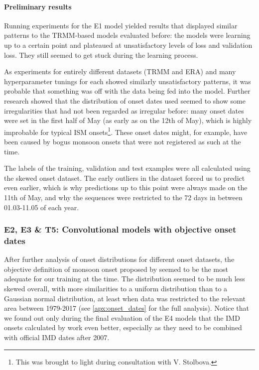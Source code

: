 \paragraph{Preliminary results}
\label{ssst:nn_e1_results}
Running experiments for the E1 model yielded results that displayed similar patterns to the TRMM-based models evaluated before: the models were learning up to a certain point and plateaued at unsatisfactory levels of loss and validation loss. They still seemed to get stuck during the learning process.

As experiments for entirely different datasets (TRMM and ERA) and many hyperparameter tunings for each showed similarly unsatisfactory patterns, it was probable that something was off with the data being fed into the model. Further research showed that the distribution of onset dates used seemed to show some irregularities that had not been regarded as irregular before: many onset dates were set in the first half of May (as early as on the 12th of May), which is highly improbable for typical ISM onsets\footnote{This was brought to light during consultation with V. Stolbova.}. These onset dates might, for example, have been caused by bogus monsoon onsets that were not registered as such at the time.

The labels of the training, validation and test examples were all calculated using the skewed onset dataset. The early outliers in the dataset forced us to predict even earlier, which is why predictions up to this point were always made on the 11th of May, and why the sequences were restricted to the 72 days in between 01.03-11.05 of each year.

\subsubsection{E2, E3 \& T5: Convolutional models with objective onset dates}
\label{sst:nn_e2t5}
After further analysis of onset distributions for different onset datasets, the objective definition of monsoon onset proposed by \citet{Singh.2009} seemed to be the most adequate for our training at the time. The distribution seemed to be much less skewed overall, with more similarities to a uniform distribution than to a Gaussian normal distribution, at least when data was restricted to the relevant area between 1979-2017 (see \cref{apx:onset_dates} for the full analysis). Notice that we found out only during the final evaluation of the E4 models that the IMD onsets calculated by \citet{Singh.2009} work even better, especially as they need to be combined with official IMD dates after 2007.

